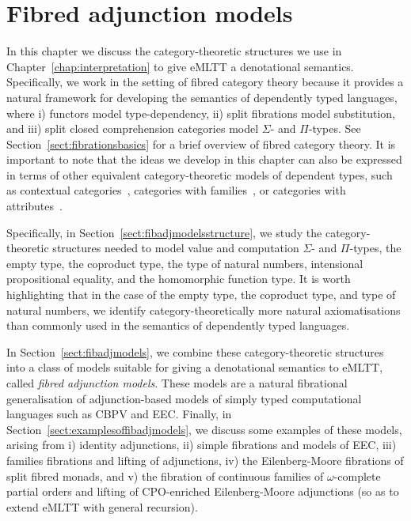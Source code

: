 
\chapter{Fibred adjunction models}
\label{chap:fibadjmodels}

In this chapter we discuss the category-theoretic structures we use in Chapter~\ref{chap:interpretation} to give eMLTT a denotational semantics. Specifically, we work in the setting of fibred category theory because it provides a natural framework for developing the semantics of dependently typed languages, where i) functors model type-dependency, ii) split fibrations model substitution, and iii) split closed comprehension categories model $\Sigma$- and $\Pi$-types. See Section~\ref{sect:fibrationsbasics} for a brief overview of fibred category theory. It is important to note that the ideas we develop in this chapter can also be expressed in terms of other equivalent category-theoretic models of dependent types, such as contextual categories~\cite{Streicher:Semantics}, categories with families~\cite{Hofmann:SyntaxAndSemantics}, or categories with attributes~\cite{Pitts:CategoricalLogic}.

Specifically, in Section~\ref{sect:fibadjmodelsstructure}, we study the category-theoretic structures needed to model value and computation $\Sigma$- and $\Pi$-types, the empty type, the coproduct type, the type of natural numbers, intensional propositional equality, and the homomorphic function type. It is worth highlighting that in the case of the empty type, the coproduct type, and type of natural numbers, we identify category-theoretically more natural axiomatisations than commonly used in the semantics of dependently typed languages.

In Section~\ref{sect:fibadjmodels}, we combine these category-theoretic structures into a class of models suitable for giving a denotational semantics to eMLTT, called \emph{fibred adjunction models}. These models are a natural fibrational generalisation of adjunction-based models of simply typed computational languages such as CBPV and EEC.
Finally, in Section~\ref{sect:examplesoffibadjmodels}, we discuss some examples of these models, arising from i) identity adjunctions, ii) simple fibrations and models of EEC, iii) families fibrations and lifting of adjunctions, iv) the Eilenberg-Moore fibrations of split fibred monads, and v) the fibration of continuous families of $\omega$-complete partial orders and lifting of CPO-enriched Eilenberg-Moore adjunctions (so as to extend eMLTT with general recursion). 


